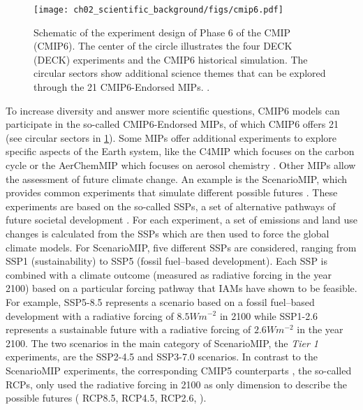 \begin{figure}[t]
  \centering
  \texttt{[image: 
    ch02\_scientific\_background/figs/cmip6.pdf]}
  \caption{Schematic of the experiment design of Phase 6 of the \acl{CMIP}
    (\acs{CMIP}6). The center of the circle illustrates the four \acs{DECK}
    (\acl{DECK}) experiments and the \acs{CMIP}6 historical simulation. The
    circular sectors show additional science themes that can be explored
    through the 21 \acs{CMIP}6-Endorsed \acfp{MIP}.
    .}
  \label{fig:02:cmip6}
\end{figure}

To increase diversity and answer more scientific questions, \acs{CMIP}6 models
can participate in the so-called \acs{CMIP}6-Endorsed \acp{MIP}, of which
\acs{CMIP}6 offers 21 (see circular sectors in \cref{fig:02:cmip6}). Some
\acp{MIP} offer additional experiments to explore specific aspects of the Earth
system, like the \ac{C4MIP} which focuses on the carbon cycle
\autocite{Jones2016} or the \ac{AerChemMIP} which focuses on aerosol chemistry
\autocite{Collins2017}. Other \acp{MIP} allow the assessment of future climate
change. An example is the \ac{ScenarioMIP}, which provides common experiments
that simulate different possible futures \autocite{ONeill2016}. These
experiments are based on the so-called \acp{SSP}, a set of alternative pathways
of future societal development \autocite{ONeill2013, ONeill2017}. For each
experiment, a set of emissions and land use changes is calculated from the
\acp{SSP} \autocite{Riahi2017} which are then used to force the global climate
models. For \ac{ScenarioMIP}, five different \acp{SSP} are considered, ranging
from \acs{SSP}1 (sustainability) to \acs{SSP}5 (fossil fuel--based
development). Each \ac{SSP} is combined with a climate outcome (measured as
radiative forcing in the year 2100) based on a particular forcing pathway that
\acp{IAM} have shown to be feasible. For example, \acs{SSP}5-8.5 represents a
scenario based on a fossil fuel--based development with a radiative forcing of
$8.5 \unit{W m^{-2}}$ in 2100 while \acs{SSP}1-2.6 represents a sustainable
future with a radiative forcing of $2.6 \unit{W m^{-2}}$ in the year 2100. The
two scenarios in the main category of \ac{ScenarioMIP}, the \emph{Tier 1}
experiments, are the \acs{SSP}2-4.5 and \acs{SSP}3-7.0 scenarios. In contrast
to the \ac{ScenarioMIP} experiments, the corresponding \acs{CMIP}5 counterparts
\autocite{Taylor2012}, the so-called \acp{RCP}, only used the radiative forcing
in 2100 as only dimension to describe the possible futures (\eg{} \acs{RCP}8.5,
\acs{RCP}4.5, \acs{RCP}2.6, \etc{}).

